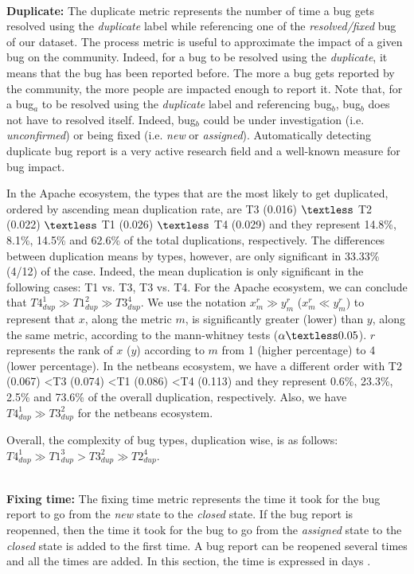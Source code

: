 \\ \vspace{0.1cm} {\bf Duplicate: }
The duplicate metric represents the number of time a bug gets resolved using the {\it duplicate} label while referencing one of the {\it resolved/fixed} bug of our dataset.
The process metric is useful to approximate the impact of a given bug on the community.
Indeed, for a bug to be resolved using the {\it duplicate}, it means that the bug has been reported before.
The more a bug gets reported by the community, the more people are impacted enough to report it.
Note that, for a bug$_a$ to be resolved using the {\it duplicate} label and referencing bug$_b$, bug$_b$ does not have to resolved itself.
Indeed, bug$_b$ could be under investigation (i.e. {\it unconfirmed}) or being fixed (i.e. {\it new} or {\it assigned}).
Automatically detecting duplicate bug report is a very active research field \cite{Sun2011,Bettenburg2008a,Nguyen2012,Jalbert2008,Tian2012a,Runeson2007} and a well-known measure for bug impact.

In the Apache ecosystem, the types that are the most likely to get duplicated, ordered by ascending mean duplication rate, are T3 (0.016) $\textless$ T2 (0.022) $\textless$ T1 (0.026) $\textless$ T4 (0.029) and they represent 14.8\%, 8.1\%, 14.5\% and 62.6\% of the total duplications, respectively.
The differences between duplication means by types, however, are only significant in 33.33\% (4/12) of the case.
Indeed, the mean duplication is only significant in the following cases: T1 vs. T3, T3 vs. T4.
For the Apache ecosystem, we can conclude that $T4_{dup}^1 \gg T1_{dup}^2 \gg T3_{dup}^4$.
We use the notation  $x_{m}^r \gg y_{m}^r$ ($x_{m}^r \ll y_{m}^r$) to represent that $x$, along the metric $m$, is significantly greater (lower) than $y$, along the same metric, according to the mann-whitney tests ($\alpha \textless 0.05$).
$r$ represents the rank of $x$ ($y$) according to $m$ from 1 (higher percentage) to 4 (lower percentage).
In the netbeans ecosystem, we have a different order with T2 (0.067) \textless T3 (0.074) \textless T1 (0.086) \textless T4 (0.113) and they represent 0.6\%, 23.3\%, 2.5\% and 73.6\% of the overall duplication, respectively. Also, we have $T4_{dup}^1 \gg T3_{dup}^2$ for the netbeans ecosystem.

Overall, the complexity of bug types, duplication wise, is as follows:  $T4_{dup}^{1} \gg T1_{dup}^{3} > T3_{dup}^{2} \gg T2_{dup}^{4}$.


\\ \vspace{0.1cm} {\bf Fixing time: } The fixing time metric represents the time it took for the bug report to go from the {\it new} state to the {\it closed} state.
If the bug report is reopenned, then the time it took for the bug to go from the {\it assigned} state to the {\it closed} state is added to the first time.
A bug report can be reopened several times and all the times are added.
In this section, the time is expressed in days \cite{Weiss2007,Zhang2012,Zhang2013}.



